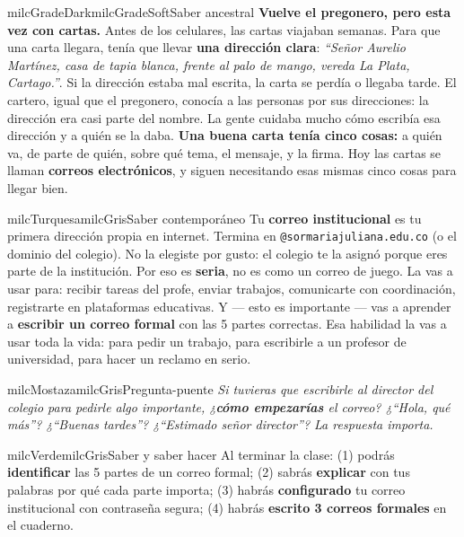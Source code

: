 \documentclass[11pt,letterpaper]{article}
\begin{document}
\begin{softbox}{milcGradeDark}{milcGradeSoft}{Saber ancestral}
\textbf{Vuelve el pregonero, pero esta vez con cartas.} Antes de los celulares, las cartas viajaban semanas. Para que una carta llegara, tenía que llevar \textbf{una dirección clara}: \emph{``Señor Aurelio Martínez, casa de tapia blanca, frente al palo de mango, vereda La Plata, Cartago.''}. Si la dirección estaba mal escrita, la carta se perdía o llegaba tarde. El cartero, igual que el pregonero, conocía a las personas por sus direcciones: la dirección era casi parte del nombre. La gente cuidaba mucho cómo escribía esa dirección y a quién se la daba. \textbf{Una buena carta tenía cinco cosas:} a quién va, de parte de quién, sobre qué tema, el mensaje, y la firma. Hoy las cartas se llaman \textbf{correos electrónicos}, y siguen necesitando esas mismas cinco cosas para llegar bien.
\end{softbox}

\begin{softbox}{milcTurquesa}{milcGris}{Saber contemporáneo}
Tu \textbf{correo institucional} es tu primera dirección propia en internet. Termina en \texttt{@sormariajuliana.edu.co} (o el dominio del colegio). No la elegiste por gusto: el colegio te la asignó porque eres parte de la institución. Por eso es \textbf{seria}, no es como un correo de juego. La vas a usar para: recibir tareas del profe, enviar trabajos, comunicarte con coordinación, registrarte en plataformas educativas. Y --- esto es importante --- vas a aprender a \textbf{escribir un correo formal} con las 5 partes correctas. Esa habilidad la vas a usar toda la vida: para pedir un trabajo, para escribirle a un profesor de universidad, para hacer un reclamo en serio.
\end{softbox}

\begin{softbox}{milcMostaza}{milcGris}{Pregunta-puente}
\textit{Si tuvieras que escribirle al director del colegio para pedirle algo importante, ¿\textbf{cómo empezarías} el correo? ¿``Hola, qué más''? ¿``Buenas tardes''? ¿``Estimado señor director''? La respuesta importa.}
\end{softbox}

\begin{softbox}{milcVerde}{milcGris}{Saber y saber hacer}
Al terminar la clase: (1) podrás \textbf{identificar} las 5 partes de un correo formal; (2) sabrás \textbf{explicar} con tus palabras por qué cada parte importa; (3) habrás \textbf{configurado} tu correo institucional con contraseña segura; (4) habrás \textbf{escrito 3 correos formales} en el cuaderno.
\end{softbox}
\end{document}
